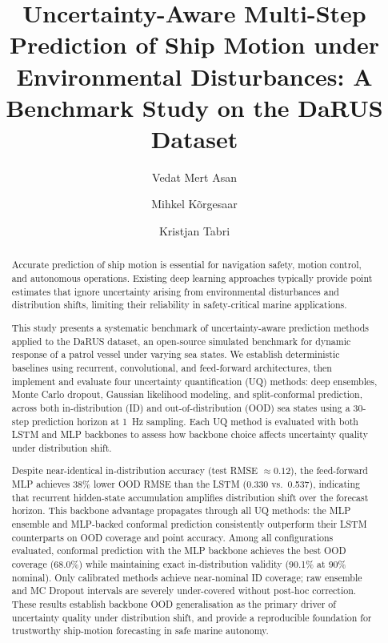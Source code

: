 \documentclass[a4paper,fleqn]{cas-sc}
\begin{document}
\title{Uncertainty-Aware Multi-Step Prediction of Ship Motion under 
Environmental Disturbances: A Benchmark Study on the DaRUS Dataset}

\author[1]{Vedat Mert Asan}

\cormark[1]

\author[1]{Mihkel Kõrgesaar}
\author[1]{Kristjan Tabri}




\begin{abstract}
Accurate prediction of ship motion is essential for navigation safety, motion control, and autonomous operations. Existing deep learning approaches typically provide point estimates that ignore uncertainty arising from environmental disturbances and distribution shifts, limiting their reliability in safety-critical marine applications.

This study presents a systematic benchmark of uncertainty-aware prediction methods applied to the DaRUS dataset, an open-source simulated benchmark for dynamic response of a patrol vessel under varying sea states. We establish deterministic baselines using recurrent, convolutional, and feed-forward architectures, then implement and evaluate four uncertainty quantification (UQ) methods: deep ensembles, Monte Carlo dropout, Gaussian likelihood modeling, and split-conformal prediction, across both in-distribution (ID) and out-of-distribution (OOD) sea states using a 30-step prediction horizon at 1~Hz sampling. Each UQ method is evaluated with both LSTM and MLP backbones to assess how backbone choice affects uncertainty quality under distribution shift. 

Despite near-identical in-distribution accuracy (test RMSE $\approx 0.12$), the feed-forward MLP achieves 38\% lower OOD RMSE than the LSTM (0.330 vs.\ 0.537), indicating that recurrent hidden-state accumulation amplifies distribution shift over the forecast horizon. This backbone advantage propagates through all UQ methods: the MLP ensemble and MLP-backed conformal prediction consistently outperform their LSTM counterparts on OOD coverage and point accuracy. Among all configurations evaluated, conformal prediction with the MLP backbone achieves the best OOD coverage (68.0\%) while maintaining exact in-distribution validity (90.1\% at 90\% nominal). Only calibrated methods achieve near-nominal ID coverage; raw ensemble and MC Dropout intervals are severely under-covered without post-hoc correction. These results establish backbone OOD generalisation as the primary driver of uncertainty quality under distribution shift, and provide a reproducible foundation for trustworthy ship-motion forecasting in safe marine autonomy.
\end{abstract}
\end{document}
